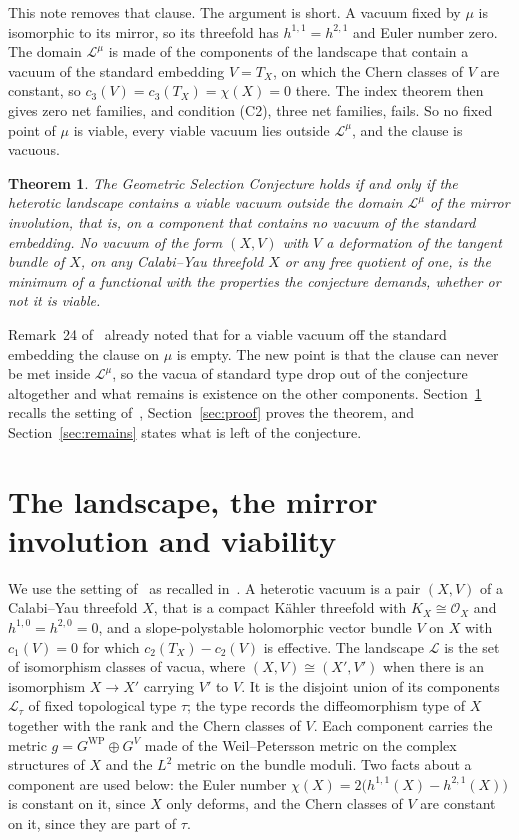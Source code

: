 \documentclass[11pt]{amsart}
\newtheorem{theorem}{Theorem}[section]
\theoremstyle{definition}
\theoremstyle{remark}
\newcommand{\cL}{\mathcal{L}}
\newcommand{\cO}{\mathcal{O}}
\newcommand{\WP}{\mathrm{WP}}
\begin{document}
This note removes that clause. The argument is short. A vacuum fixed by $\mu$
is isomorphic to its mirror, so its threefold has $h^{1,1}=h^{2,1}$ and Euler
number zero. The domain $\cL^\mu$ is made of the components of the landscape
that contain a vacuum of the standard embedding $V=T_X$, on which the Chern
classes of $V$ are constant, so $c_3(V)=c_3(T_X)=\chi(X)=0$ there. The index
theorem then gives zero net families, and condition (C2), three net families,
fails. So no fixed point of $\mu$ is viable, every viable vacuum lies outside
$\cL^\mu$, and the clause is vacuous.

\begin{theorem}\label{thm:main}
The Geometric Selection Conjecture holds if and only if the heterotic
landscape contains a viable vacuum outside the domain $\cL^\mu$ of the mirror
involution, that is, on a component that contains no vacuum of the standard
embedding. No vacuum of the form $(X,V)$ with $V$ a deformation of the
tangent bundle of $X$, on any Calabi--Yau threefold $X$ or any free quotient
of one, is the minimum of a functional with the properties the conjecture
demands, whether or not it is viable.
\end{theorem}

Remark~24 of~\cite{BB26} already noted that for a viable vacuum off the
standard embedding the clause on $\mu$ is empty. The new point is that the
clause can never be met inside $\cL^\mu$, so the vacua of standard type drop
out of the conjecture altogether and what remains is existence on the other
components. Section~\ref{sec:setting} recalls the setting
of~\cite{Bha26a,BB26}, Section~\ref{sec:proof} proves the theorem, and
Section~\ref{sec:remains} states what is left of the conjecture.

\section{The landscape, the mirror involution and viability}\label{sec:setting}

We use the setting of~\cite{Bha26a} as recalled in~\cite[Section~9]{BB26}.
A heterotic vacuum is a pair $(X,V)$ of a Calabi--Yau threefold $X$, that is a
compact K\"ahler threefold with $K_X\cong\cO_X$ and $h^{1,0}=h^{2,0}=0$, and a
slope-polystable holomorphic vector bundle $V$ on $X$ with $c_1(V)=0$ for which
$c_2(T_X)-c_2(V)$ is effective. The landscape $\cL$ is the set of isomorphism
classes of vacua, where $(X,V)\cong(X',V')$ when there is an isomorphism
$X\to X'$ carrying $V'$ to $V$. It is the disjoint union of its components
$\cL_\tau$ of fixed topological type $\tau$; the type records the
diffeomorphism type of $X$ together with the rank and the Chern classes of
$V$. Each component carries the metric $g=G^{\WP}\oplus G^V$ made of the
Weil--Petersson metric on the complex structures of $X$ and the $L^2$ metric
on the bundle moduli. Two facts about a component are used below: the Euler
number $\chi(X)=2\big(h^{1,1}(X)-h^{2,1}(X)\big)$ is constant on it, since $X$
only deforms, and the Chern classes of $V$ are constant on it, since they are
part of $\tau$.
\end{document}
